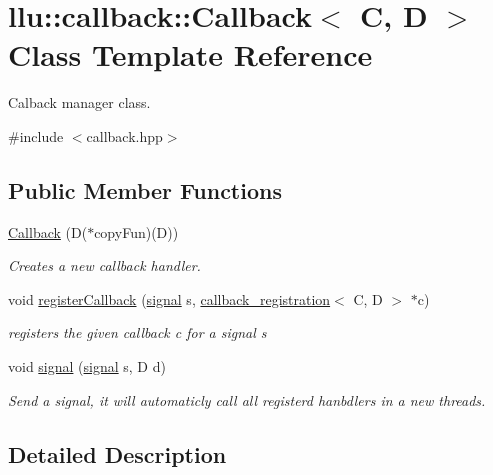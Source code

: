 \hypertarget{classllu_1_1callback_1_1_callback}{\section{llu\+:\+:callback\+:\+:Callback$<$ C, D $>$ Class Template Reference}
\label{classllu_1_1callback_1_1_callback}
}


Calback manager class.  




{\ttfamily \#include $<$callback.\+hpp$>$}

\subsection*{Public Member Functions}
\begin{DoxyCompactItemize}
\item 
\hyperlink{classllu_1_1callback_1_1_callback_ad55e4e75a473f3cfe0f5bdbe1ae01a62}{Callback} (D($\ast$copy\+Fun)(D))
\begin{DoxyCompactList}\small\item\em Creates a new callback handler. \end{DoxyCompactList}\item 
void \hyperlink{classllu_1_1callback_1_1_callback_a45aaaa527c1623dba2e994df5049ef50}{register\+Callback} (\hyperlink{namespacellu_1_1callback_a082ed24306809c4d250bd5ddfbae177f}{signal} s, \hyperlink{classllu_1_1callback_1_1callback__registration}{callback\+\_\+registration}$<$ C, D $>$ $\ast$c)
\begin{DoxyCompactList}\small\item\em registers the given callback c for a signal s \end{DoxyCompactList}\item 
void \hyperlink{classllu_1_1callback_1_1_callback_acfe12b080db1647066890956c1aa8b8b}{signal} (\hyperlink{namespacellu_1_1callback_a082ed24306809c4d250bd5ddfbae177f}{signal} s, D d)
\begin{DoxyCompactList}\small\item\em Send a signal, it will automaticly call all registerd hanbdlers in a new threads. \end{DoxyCompactList}\end{DoxyCompactItemize}


\subsection{Detailed Description}

